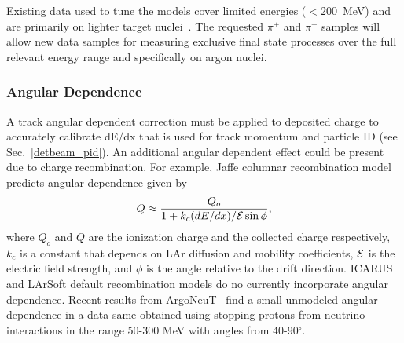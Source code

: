 Existing data used to tune the models
cover limited energies ($<$200~MeV) and are primarily on lighter target nuclei~\cite{fsirev}.
The requested $\pi^+$ and $\pi^-$ samples will allow new data samples for measuring
exclusive final state processes over the full relevant energy range and specifically on argon nuclei. 



 


\subsubsection{Angular Dependence}

\label{sec_angle}


A track angular dependent correction must be
applied to deposited charge to accurately calibrate
dE/dx that is used for track momentum and particle ID (see Sec.~\ref{detbeam_pid}). 
An additional angular dependent effect could be present 
due to charge recombination. 
For example, Jaffe columnar recombination model~\cite{jaffe,argoneut_angle} predicts 
angular dependence given by 
$$Q \approx \frac{Q_o}{1+k_c (dE/dx) / {\cal E} \sin\phi}, $$ 
where
$Q_o$ and $Q$ are the ionization charge and the collected charge respectively, 
$k_c$ is a constant that depends on LAr diffusion and mobility coefficients, $\cal E$ 
is the electric field strength, and $\phi$ is the angle relative to the drift direction.
%
ICARUS~\cite{icarus_recombination} and LArSoft default recombination models do no currently incorporate angular dependence. 
Recent results from ArgoNeuT~\cite{argoneut_angle} find a small unmodeled
angular dependence in a data same obtained using stopping protons from 
neutrino interactions in the range 50-300 MeV with angles from 40-90$^{\circ}$.


